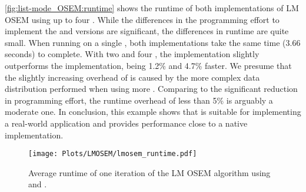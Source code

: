 \autoref{fig:list-mode_OSEM:runtime} shows the runtime of both implementations of LM OSEM using up to four \GPUs.
While the differences in the programming effort to implement the \SkelCL and \OpenCL versions are significant, the differences in runtime are quite small.
When running on a single \GPU, both implementations take the same time (3.66 seconds) to complete.
With two and four \GPUs, the \OpenCL implementation slightly outperforms the \SkelCL implementation, being 1.2\% and 4.7\% faster.
We presume that the slightly increasing overhead of \SkelCL is caused by the more complex data distribution performed when using more \GPUs.
Comparing to the significant reduction in programming effort, the runtime overhead of less than 5\% is arguably a moderate one.
In conclusion, this example shows that \SkelCL is suitable for implementing a real-world application and provides performance close to a native \OpenCL implementation.

\begin{figure}
  \centering
  \texttt{[image: Plots/LMOSEM/lmosem\_runtime.pdf]}
  \caption[Average runtime of one iteration of the LM OSEM algorithm.]%
          {Average runtime of one iteration of the LM OSEM algorithm using \OpenCL and \SkelCL.}
  \label{fig:list-mode_OSEM:runtime}
\end{figure}


